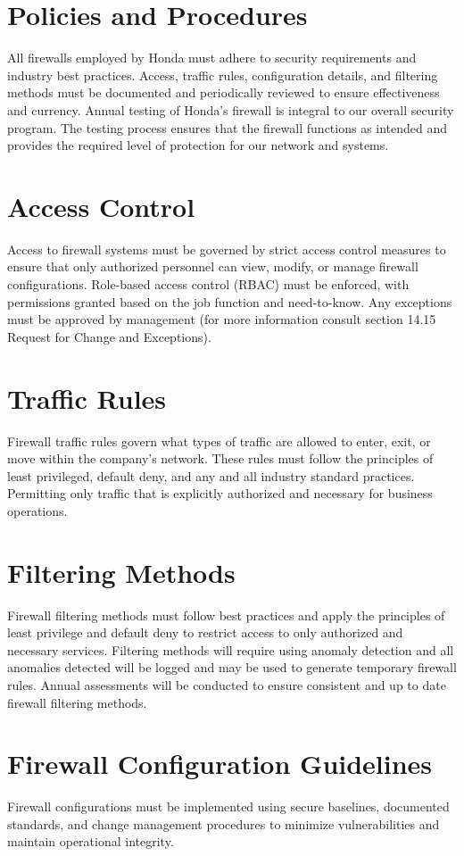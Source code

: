 \section{Policies and Procedures}
All firewalls employed by Honda must adhere to security requirements and industry best practices. Access, traffic rules, configuration details, and filtering methods must be documented and periodically reviewed to ensure effectiveness and currency. Annual testing of Honda's firewall is integral to our overall security program. The testing process ensures that the firewall functions as intended and provides the required level of protection for our network and systems. 

 
    \section{Access Control}
    Access to firewall systems must be governed by strict access control measures to ensure that only authorized personnel can view, modify, or manage firewall configurations. Role-based access control (RBAC) must be enforced, with permissions granted based on the job function and need-to-know. Any exceptions must be approved by management (for more information consult section 14.15 Request for Change and Exceptions).

    \section{Traffic Rules}
    Firewall traffic rules govern what types of traffic are allowed to enter, exit, or move within the company's network. These rules must follow the principles of least privileged, default deny, and any and all industry standard practices. Permitting only traffic that is explicitly authorized and necessary for business operations.

    \section{Filtering Methods}
    Firewall filtering methods must follow best practices and apply the principles of least privilege and default deny to restrict access to only authorized and necessary services. Filtering methods will require using anomaly detection and all anomalies detected will be logged and may be used to generate temporary firewall rules. Annual assessments will be conducted to ensure consistent and up to date firewall filtering methods.

    \section{Firewall Configuration Guidelines}
    Firewall configurations must be implemented using secure baselines, documented standards, and change management procedures to minimize vulnerabilities and maintain operational integrity. 

